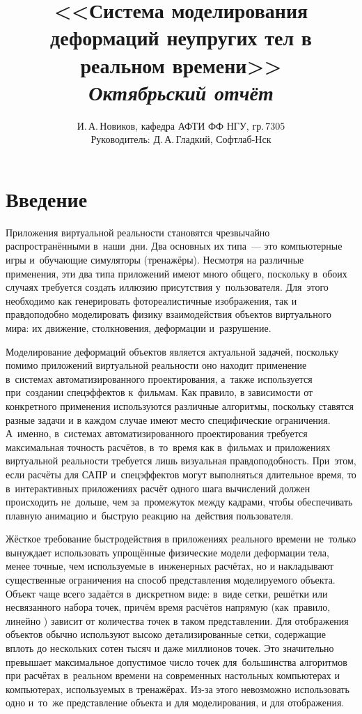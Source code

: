 \documentclass[a4paper,11pt]{report}
\author{И.\,А.\,Новиков, кафедра АФТИ ФФ НГУ, гр.\,7305\\ Руководитель: Д.\,А.\,Гладкий, Софтлаб-Нск}
\title{<<Система моделирования деформаций неупругих тел в реальном времени>>\\\itshape Октябрьский отчёт}
\begin{document}
  \maketitle
  \tableofcontents
  \chapter*{Введение}

    Приложения виртуальной реальности становятся чрезвычайно распространёнными в~наши~дни.  Два
    основных их типа~--- это компьютерные игры и~обучающие симуляторы (тренажёры). Несмотря на
    различные применения, эти два типа приложений имеют много общего, поскольку в~обоих случаях
    требуется создать иллюзию присутствия у~пользователя. Для~этого необходимо как генерировать
    фотореалистичные изображения, так и правдоподобно моделировать физику взаимодействия объектов
    виртуального мира: их движение, столкновения, деформации и~разрушение.

    Моделирование деформаций объектов является актуальной задачей, поскольку помимо приложений
    виртуальной реальности оно находит применение в~системах автоматизированного проектирования, а~также используется
    при~создании спецэффектов к~фильмам.  Как правило, в зависимости от конкретного применения
    используются различные алгоритмы, поскольку ставятся разные задачи и в каждом случае имеют место
    специфические ограничения. А~именно, в~системах автоматизированного проектирования требуется
    максимальная точность расчётов, в~то~время как в~фильмах и приложениях виртуальной реальности
    требуется лишь визуальная правдоподобность. При~этом, если расчёты для САПР и~спецэффектов могут
    выполняться длительное время, то в~интерактивных приложениях расчёт одного шага вычислений должен
    происходить не~дольше, чем за~промежуток между кадрами, чтобы обеспечивать плавную анимацию
    и~быструю реакцию на~действия пользователя.

    Жёсткое требование быстродействия в приложениях реального времени не~только вынуждает
    использовать упрощённые физические модели деформации тела, менее точные, чем используемые
    в~инженерных расчётах, но и накладывают существенные ограничения на способ представления
    моделируемого объекта. Объект чаще всего задаётся в~дискретном виде: в~виде сетки, решётки или
    несвязанного набора точек, причём время расчётов напрямую (как~правило, линейно
    \cite{mueller-meshless}) зависит от количества точек в таком представлении. Для отображения
    объектов обычно используют высоко детализированные сетки, содержащие вплоть до нескольких
    сотен тысяч и даже миллионов точек. Это значительно превышает максимальное допустимое число точек для~большинства
    алгоритмов \cite{mueller-stable, mueller-meshless, chang-crash} при расчётах в~реальном времени на
    современных настольных компьютерах и компьютерах, используемых в тренажёрах. Из-за этого
    невозможно использовать одно и~то~же представление объекта и для моделирования, и для
    отображения.
\end{document}
